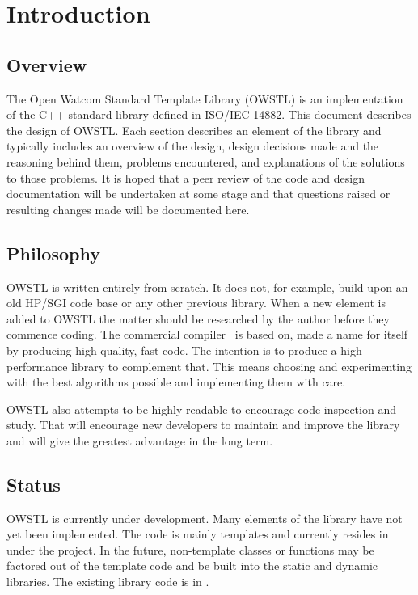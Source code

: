 
\chapter{Introduction}

\section{Overview}

The Open Watcom Standard Template Library (OWSTL) is an implementation of the
C++ standard library defined in ISO/IEC 14882. This document describes the
design of OWSTL. Each section describes an element of the library and
typically includes an overview of the design, design decisions made and the
reasoning behind them, problems encountered, and explanations of the solutions
to those problems. It is hoped that a peer review of the code and design
documentation will be undertaken at some stage and that questions raised or
resulting changes made will be documented here.

\section{Philosophy}

OWSTL is written entirely from scratch. It does not, for example, build upon
an old HP/SGI code base or any other previous library. When a new element is
added to OWSTL the matter should be researched by the author before they
commence coding. The commercial compiler \OW\ is based on, made a name for
itself by producing high quality, fast code. The intention is to produce a
high performance library to complement that. This means choosing and
experimenting with the best algorithms possible and implementing them with
care.

OWSTL also attempts to be highly readable to encourage code inspection and
study.  That will encourage new developers to maintain and improve the library
and will give the greatest advantage in the long term.

\section{Status}

OWSTL is currently under development. Many elements of the library have not
yet been implemented. The code is mainly templates and currently resides in
under the  project. In the future, non-template classes or
functions may be factored out of the template code and be built into the
static and dynamic libraries. The existing library code is in
.

